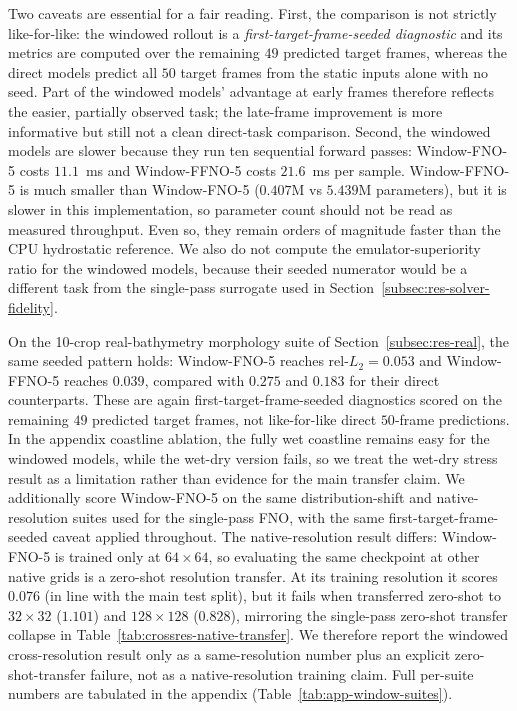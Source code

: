 Two caveats are essential for a fair reading. First, the comparison is not strictly like-for-like: the windowed rollout is a \emph{first-target-frame-seeded diagnostic} and its metrics are computed over the remaining $49$ predicted target frames, whereas the direct models predict all $50$ target frames from the static inputs alone with no seed. Part of the windowed models' advantage at early frames therefore reflects the easier, partially observed task; the late-frame improvement is more informative but still not a clean direct-task comparison. Second, the windowed models are slower because they run ten sequential forward passes: Window-FNO-5 costs $11.1$~ms and Window-FFNO-5 costs $21.6$~ms per sample. Window-FFNO-5 is much smaller than Window-FNO-5 ($0.407$M vs $5.439$M parameters), but it is slower in this implementation, so parameter count should not be read as measured throughput. Even so, they remain orders of magnitude faster than the CPU hydrostatic reference. We also do not compute the emulator-superiority ratio for the windowed models, because their seeded numerator would be a different task from the single-pass surrogate used in Section~\ref{subsec:res-solver-fidelity}.

On the 10-crop real-bathymetry morphology suite of Section~\ref{subsec:res-real}, the same seeded pattern holds: Window-FNO-5 reaches rel-$L_2 = 0.053$ and Window-FFNO-5 reaches $0.039$, compared with $0.275$ and $0.183$ for their direct counterparts. These are again first-target-frame-seeded diagnostics scored on the remaining $49$ predicted target frames, not like-for-like direct $50$-frame predictions. In the appendix coastline ablation, the fully wet coastline remains easy for the windowed models, while the wet-dry version fails, so we treat the wet-dry stress result as a limitation rather than evidence for the main transfer claim. We additionally score Window-FNO-5 on the same distribution-shift and native-resolution suites used for the single-pass FNO, with the same first-target-frame-seeded caveat applied throughout. The native-resolution result differs: Window-FNO-5 is trained only at $64 \times 64$, so evaluating the same checkpoint at other native grids is a zero-shot resolution transfer. At its training resolution it scores $0.076$ (in line with the main test split), but it fails when transferred zero-shot to $32 \times 32$ ($1.101$) and $128 \times 128$ ($0.828$), mirroring the single-pass zero-shot transfer collapse in Table~\ref{tab:crossres-native-transfer}. We therefore report the windowed cross-resolution result only as a same-resolution number plus an explicit zero-shot-transfer failure, not as a native-resolution training claim. Full per-suite numbers are tabulated in the appendix (Table~\ref{tab:app-window-suites}).

